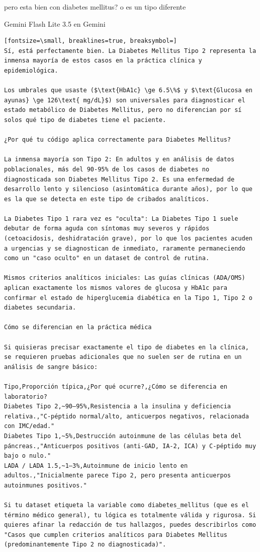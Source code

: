 \documentclass[12pt,a4paper,oneside]{book}
\begin{document}
\begin{iaprompt}
pero esta bien con diabetes mellitus? o es un tipo diferente
\end{iaprompt}
\begin{iaresp}{Gemini Flash Lite 3.5 en Gemini}
\begin{Verbatim}[fontsize=\small, breaklines=true, breaksymbol=]
Sí, está perfectamente bien. La Diabetes Mellitus Tipo 2 representa la inmensa mayoría de estos casos en la práctica clínica y epidemiológica.

Los umbrales que usaste ($\text{HbA1c} \ge 6.5\%$ y $\text{Glucosa en ayunas} \ge 126\text{ mg/dL}$) son universales para diagnosticar el estado metabólico de Diabetes Mellitus, pero no diferencian por sí solos qué tipo de diabetes tiene el paciente.

¿Por qué tu código aplica correctamente para Diabetes Mellitus?

La inmensa mayoría son Tipo 2: En adultos y en análisis de datos poblacionales, más del 90-95% de los casos de diabetes no diagnosticada son Diabetes Mellitus Tipo 2. Es una enfermedad de desarrollo lento y silencioso (asintomática durante años), por lo que es la que se detecta en este tipo de cribados analíticos.

La Diabetes Tipo 1 rara vez es "oculta": La Diabetes Tipo 1 suele debutar de forma aguda con síntomas muy severos y rápidos (cetoacidosis, deshidratación grave), por lo que los pacientes acuden a urgencias y se diagnostican de inmediato, raramente permaneciendo como un "caso oculto" en un dataset de control de rutina.

Mismos criterios analíticos iniciales: Las guías clínicas (ADA/OMS) aplican exactamente los mismos valores de glucosa y HbA1c para confirmar el estado de hiperglucemia diabética en la Tipo 1, Tipo 2 o diabetes secundaria.

Cómo se diferencian en la práctica médica

Si quisieras precisar exactamente el tipo de diabetes en la clínica, se requieren pruebas adicionales que no suelen ser de rutina en un análisis de sangre básico:

Tipo,Proporción típica,¿Por qué ocurre?,¿Cómo se diferencia en laboratorio?
Diabetes Tipo 2,~90–95%,Resistencia a la insulina y deficiencia relativa.,"C-péptido normal/alto, anticuerpos negativos, relacionada con IMC/edad."
Diabetes Tipo 1,~5%,Destrucción autoinmune de las células beta del páncreas.,"Anticuerpos positivos (anti-GAD, IA-2, ICA) y C-péptido muy bajo o nulo."
LADA / LADA 1.5,~1–3%,Autoinmune de inicio lento en adultos.,"Inicialmente parece Tipo 2, pero presenta anticuerpos autoinmunes positivos."

Si tu dataset etiqueta la variable como diabetes_mellitus (que es el término médico general), tu lógica es totalmente válida y rigurosa. Si quieres afinar la redacción de tus hallazgos, puedes describirlos como "Casos que cumplen criterios analíticos para Diabetes Mellitus (predominantemente Tipo 2 no diagnosticada)".
\end{Verbatim}
\end{iaresp}
\end{document}
